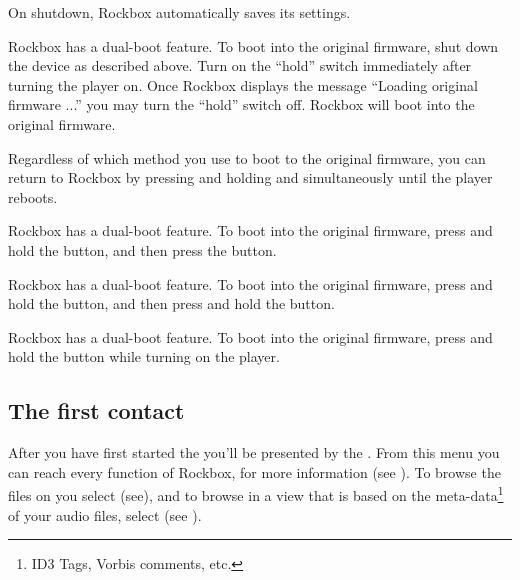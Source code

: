 \label{ref:Safeshutdown}On shutdown, Rockbox automatically saves its settings.

  {
    {  
    Rockbox has a dual-boot feature.  To boot into the original firmware, shut 
    down the device as described above.  Turn on the ``hold'' switch 
    immediately after turning the player on. Once Rockbox displays the 
    message ``Loading original firmware ...'' you may turn the ``hold'' 
    switch off.  Rockbox will boot into the original firmware. 
    
    
    Regardless of which method you use to boot to the original firmware, you can 
    return to Rockbox by pressing and holding \ButtonMenu{} and \ButtonSelect{} 
    simultaneously until the player reboots.
    }

    {
    Rockbox has a dual-boot feature.  To boot into the original firmware, 
    press and hold the \ButtonRec{} button, and then press the \ButtonOn{} 
    button.
    }
  
    { 
    Rockbox has a dual-boot feature.  To boot into the original firmware, 
    press and hold the \ButtonRec{} button, and then press and hold the 
    \ButtonOn{} button.
    }
  
    {
    Rockbox has a dual-boot feature.  To boot into the original firmware, 
    press and hold the \ButtonRew{} button while turning on the player.
    }
  }


\subsection{The first contact}

After you have first started the \dap{} you'll be presented by the
. From this menu you can reach every function of Rockbox,
for more information (see ). To browse the files
on you \dap{} select  (see), and to
browse in a view that is based on the meta-data\footnote{ID3 Tags, Vorbis
comments, etc.} of your audio files, select  (see
).

